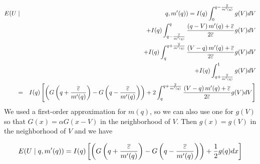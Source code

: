 \documentclass[12pt]{article}
\begin{document}
\begin{eqnarray*}
E(U &\mid &q,m^{\prime }(q))=I(q)\int\nolimits_{0}^{q-\frac{\overline{%
\varepsilon }}{m^{\prime }(q)}}g(V)dV \\
&&+I(q)\int\nolimits_{q-\frac{\overline{\varepsilon }}{m^{\prime }(q)}}^{q}%
\frac{\left( q-V\right) m^{\prime }(q)+\overline{\varepsilon }}{2\overline{%
\varepsilon }}g(V)dV \\
&&+I(q)\int\nolimits_{q}^{q+\frac{\overline{\varepsilon }}{m^{\prime }(q)}}%
\frac{\left( V-q\right) m^{\prime }(q)+\overline{\varepsilon }}{2\overline{%
\varepsilon }}g(V)dV \\
&&+I(q)\int\nolimits_{q+\frac{\overline{\varepsilon }}{m^{\prime }(q)}%
}^{1}g(V)dV \\
&=&I(q)\left[ \left( G\left( q+\frac{\overline{\varepsilon }}{m^{\prime }(q)}%
\right) -G\left( q-\frac{\overline{\varepsilon }}{m^{\prime }(q)}\right)
\right) +2\int\nolimits_{q}^{q+\frac{\overline{\varepsilon }}{m^{\prime }(q)}%
}\frac{\left( V-q\right) m^{\prime }(q)+\overline{\varepsilon }}{2\overline{%
\varepsilon }}g(V)dV\right]
\end{eqnarray*}%
We used a first-order approximation for $m(q)$, so we can also use one for $%
g(V)$ so that $G(x)=\alpha G(x-V)$ in the neighborhood of $V$. Then $%
g(x)=g(V)$ in the neighborhood of $V$ and we have

\[
E(U\mid q,m^{\prime }(q))=I(q)\left[ \left( G\left( q+\frac{\overline{%
\varepsilon }}{m^{\prime }(q)}\right) -G\left( q-\frac{\overline{\varepsilon 
}}{m^{\prime }(q)}\right) \right) +\frac{1}{2}g(q)dx\right] 
\]
\end{document}
